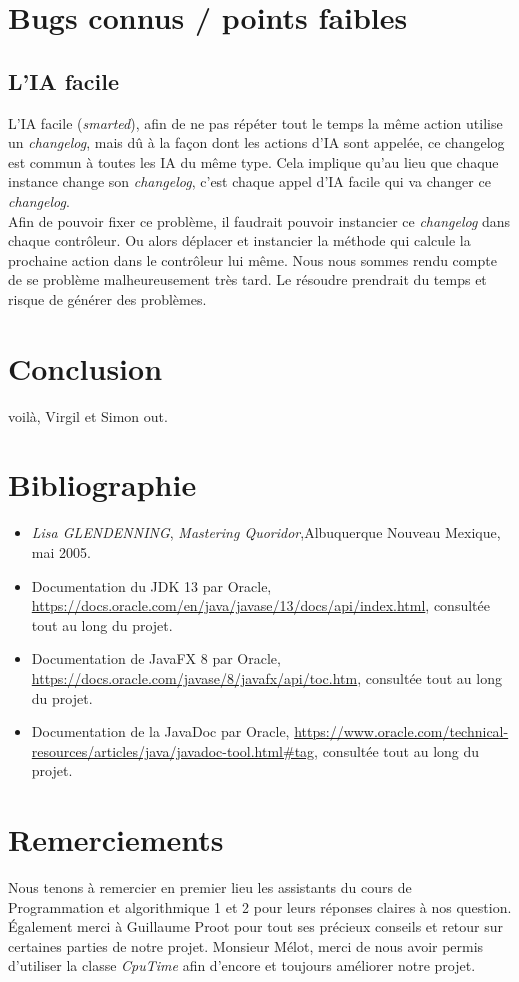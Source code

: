 \documentclass[a4paper, 12pt]{article}
\begin{document}
\section{Bugs connus / points faibles}

\subsection{L'IA facile}
L'IA facile (\textit{smarted}), afin de ne pas répéter tout le temps la même action utilise un \textit{changelog}, mais dû à la façon dont les actions d'IA sont appelée, ce changelog est commun à toutes les IA du même type. Cela implique qu'au lieu que chaque instance change son \textit{changelog}, c'est chaque appel d'IA facile qui va changer ce \textit{changelog}. \\

Afin de pouvoir fixer ce problème, il faudrait pouvoir instancier ce \textit{changelog} dans chaque contrôleur. Ou alors déplacer et instancier la méthode qui calcule la prochaine action dans le contrôleur lui même. Nous nous sommes rendu compte de se problème malheureusement très tard. Le résoudre prendrait du temps et risque de générer des problèmes.

\section{Conclusion}

voilà, Virgil et Simon out.

\section{Bibliographie}
\begin{itemize}
\item \emph{Lisa GLENDENNING}, \textit{Mastering Quoridor},Albuquerque Nouveau Mexique, mai 2005.
\item Documentation du JDK 13 par Oracle, \url{https://docs.oracle.com/en/java/javase/13/docs/api/index.html}, consultée tout au long du projet.
\item Documentation de JavaFX 8 par Oracle, \url{https://docs.oracle.com/javase/8/javafx/api/toc.htm}, consultée tout au long du projet.
\item Documentation de la JavaDoc par Oracle, \url{https://www.oracle.com/technical-resources/articles/java/javadoc-tool.html#tag}, consultée tout au long du projet.
\end{itemize}

\section{Remerciements}

Nous tenons à remercier en premier lieu les assistants du cours de Programmation et algorithmique 1 et 2 pour leurs réponses claires à nos question.
Également merci à Guillaume Proot pour tout ses précieux conseils et retour sur certaines parties de notre projet.
Monsieur Mélot, merci de nous avoir permis d'utiliser la classe \textit{CpuTime} afin d'encore et toujours améliorer notre projet.
\end{document}
